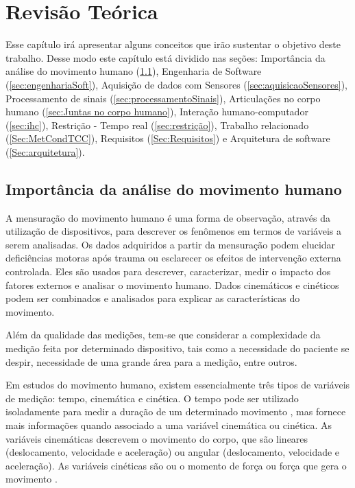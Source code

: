 
\chapter[Revisão Teórica]{Revisão Teórica}
  Esse capítulo irá apresentar alguns conceitos que irão sustentar o objetivo deste trabalho.
Desse modo este capítulo está dividido nas seções: Importância da análise do movimento humano (\ref{sec:importancia}),
Engenharia de Software (\ref{sec:engenhariaSoft}), Aquisição de dados com Sensores (\ref{sec:aquisicaoSensores}),
Processamento de sinais (\ref{sec:processamentoSinais}), Articulações no corpo humano (\ref{sec:Juntas no corpo humano}), Interação humano-computador (\ref{sec:ihc}), Restrição - Tempo real (\ref{sec:restrição}),
Trabalho relacionado (\ref{Sec:MetCondTCC}), Requisitos (\ref{Sec:Requisitos}) e Arquitetura de software (\ref{Sec:arquitetura}).

\section{Importância da análise do movimento humano}\label{sec:importancia}

A mensuração do movimento humano é uma forma de observação, através da utilização
de dispositivos, para descrever os fenômenos em termos de variáveis a serem analisadas.
Os dados adquiridos a partir da mensuração podem elucidar deficiências
motoras após trauma ou esclarecer os efeitos de intervenção externa controlada.
Eles são usados para descrever, caracterizar, medir o impacto dos
fatores externos e analisar o movimento humano. Dados cinemáticos e cinéticos podem ser combinados
e analisados para explicar as características do movimento.

Além da qualidade das medições, tem-se que considerar a complexidade da medição
feita por determinado dispositivo, tais como a necessidade do paciente se despir,
necessidade de uma grande área para a medição, entre outros.

Em estudos do movimento humano, existem essencialmente três tipos de variáveis de medição: tempo,
cinemática e cinética. O tempo pode ser utilizado isoladamente para medir a duração de um determinado movimento
, mas fornece mais informações quando associado a uma variável cinemática ou cinética.
As variáveis cinemáticas descrevem o movimento do corpo, que são lineares (deslocamento,
velocidade e aceleração) ou angular (deslocamento, velocidade e aceleração).
 As variáveis cinéticas são ou o momento de força ou força que gera o movimento \cite{roberto}.

